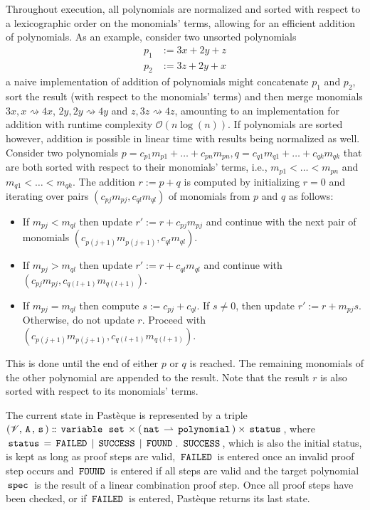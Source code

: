 Throughout execution, all polynomials are normalized and sorted with respect to a lexicographic order on the monomials' terms, allowing for an efficient addition of polynomials.
As an example, consider two unsorted polynomials
\begin{align*}
	p_1 & := 3x + 2y + z \\
	p_2 & := 3z + 2y + x
\end{align*}
a naive implementation of addition of polynomials might concatenate $p_1$ and $p_2$, sort the result (with respect to the monomials' terms) and then merge monomials $3x,x \rightsquigarrow 4x$, $2y,2y \rightsquigarrow 4y$ and $z,3z \rightsquigarrow 4z$, amounting to an implementation for addition with runtime complexity $\mathcal{O}(n\log(n))$.
If polynomials are sorted however, addition is possible in linear time with results being normalized as well.
Consider two polynomials $p = c_{p1}m_{p1} + \dots + c_{pn}m_{pn}, q = c_{q1}m_{q1} + \dots + c_{qk}m_{qk}$ that are both sorted with respect to their monomials' terms, i.e., $m_{p1} < \dots < m_{pn}$ and $m_{q1} < \dots < m_{qk}$.
The addition $r := p+q$ is computed by initializing $r=0$ and iterating over pairs $(c_{pj}m_{pj},c_{ql}m_{ql})$ of monomials from $p$ and $q$ as follows:
\begin{itemize}
	\item If $m_{pj} < m_{ql}$ then update $r' := r + c_{pj}m_{pj}$ and continue with the next pair of monomials $(c_{p(j+1)}m_{p(j+1)},c_{ql}m_{ql})$.
	\item If $m_{pj} > m_{ql}$ then update $r' := r + c_{ql}m_{ql}$ and continue with $(c_{pj}m_{pj},c_{q(l+1)}m_{q(l+1)})$.
	\item If $m_{pj} = m_{ql}$ then compute $s := c_{pj} + c_{ql}$.
	      If $s \neq 0$, then update $r' := r + m_{pj}s$.
	      Otherwise, do not update $r$.
	      Proceed with $(c_{p(j+1)}m_{p(j+1)},c_{q(l+1)}m_{q(l+1)})$.
\end{itemize}
This is done until the end of either $p$ or $q$ is reached.
The remaining monomials of the other polynomial are appended to the result.
Note that the result $r$ is also sorted with respect to its monomials' terms.

The current state in Pastèque is represented by a triple $(\mathscr{V}, \,\text{\ttfamily A}\,, \,\text{\ttfamily s}\,) \mathrel{\mathord{:}\mkern-1.2mu\mathord{:}} \,\text{\ttfamily variable}\, \; \,\text{\ttfamily set}\, \times (\,\text{\ttfamily nat}\, \rightharpoonup \,\text{\ttfamily polynomial}\,) \times \,\text{\ttfamily status}\,$, where $\,\text{\ttfamily status}\, = \,\text{\ttfamily FAILED}\, \mid \,\text{\ttfamily SUCCESS}\, \mid \,\text{\ttfamily FOUND}\,$.
$\,\text{\ttfamily SUCCESS}\,$, which is also the initial status, is kept as long as proof steps are valid, $\,\text{\ttfamily FAILED}\,$ is entered once an invalid proof step occurs and $\,\text{\ttfamily FOUND}\,$ is entered if all steps are valid and the target polynomial $\,\text{\ttfamily spec}\,$ is the result of a linear combination proof step.
Once all proof steps have been checked, or if $\,\text{\ttfamily FAILED}\,$ is entered, Pastèque returns its last state.

